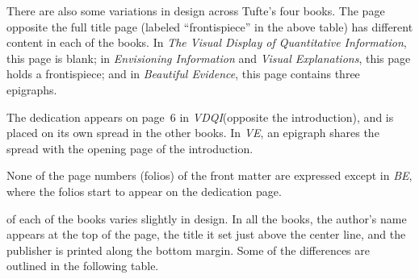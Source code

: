 \documentclass{tufte-book}
\newcommand{\vdqi}{\textit{VDQI}\xspace}
\newcommand{\ve}{\textit{VE}\xspace}
\newcommand{\be}{\textit{BE}\xspace}
\newcommand{\VDQI}{\textit{The Visual Display of Quantitative Information}\xspace}
\newcommand{\EI}{\textit{Envisioning Information}\xspace}
\newcommand{\VE}{\textit{Visual Explanations}\xspace}
\newcommand{\BE}{\textit{Beautiful Evidence}\xspace}
\begin{document}
    There are also some variations in design across Tufte's four books.  The
    page opposite the full title page (labeled ``frontispiece'' in the above
    table) has different content in each of the books.  In \VDQI, this page is
    blank; in \EI and \VE, this page holds a frontispiece; and in \BE, this
    page contains three epigraphs.
    
    The dedication appears on page~6 in \vdqi (opposite the introduction), and
    is placed on its own spread in the other books.  In \ve, an epigraph shares
    the spread with the opening page of the introduction.
    
    None of the page numbers (folios) of the front matter are expressed except in
    \be, where the folios start to appear on the dedication page.
    
     of each of the books varies slightly in
    design.  In all the books, the author's name appears at the top of the
    page, the title it set just above the center line, and the publisher is
    printed along the bottom margin.  Some of the differences are outlined in
    the following table.
    
\end{document}
